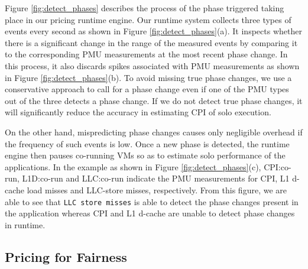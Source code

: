 \documentclass{sig-alternate}
\begin{document}
Figure \ref{fig:detect_phases} describes the process of the phase triggered taking place in our pricing runtime engine. Our runtime system collects three types of events every second as shown in Figure \ref{fig:detect_phases}(a). It inspects whether there is a significant change in the range of the measured events by comparing it to the corresponding PMU measurements at the most recent phase change. In this process, it also discards spikes associated with PMU measurements as shown in Figure \ref{fig:detect_phases}(b). To avoid missing true phase changes, we use a conservative approach to call for a phase change even if one of the PMU types out of the three detects a phase change. If we do not detect true phase changes, it will significantly reduce the accuracy in estimating CPI of solo execution. 

On the other hand, mispredicting phase changes causes only negligible overhead if the frequency of such events is low. Once a new phase is detected, the runtime engine then pauses co-running VMs so as to estimate solo performance of the applications. In the example as shown in Figure \ref{fig:detect_phases}(c), CPI:co-run, L1D:co-run and LLC:co-run indicate the PMU measurements for CPI, L1 d-cache load misses and LLC-store misses, respectively. From this figure, we are able to see that \texttt{LLC store misses} is able to detect the phase changes present in the application whereas CPI and L1 d-cache are unable to detect phase changes in runtime.
\subsection{Pricing for Fairness}
\label{subsec:PricingforFairness}
\end{document}
